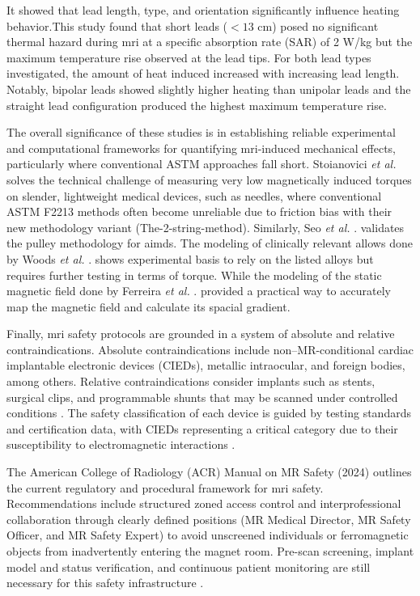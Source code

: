 It showed that lead length, type, and orientation significantly influence heating behavior.This study found that short leads ($<13$ cm) posed no significant thermal hazard during \gls{mri} at a specific absorption rate (SAR) of 2 W/kg but the maximum temperature rise observed at the lead tips. For both lead types investigated, the amount of heat induced increased with increasing lead length. Notably, bipolar leads showed slightly higher heating than unipolar leads and the straight lead configuration produced the highest maximum temperature rise.


The overall significance of these studies is in establishing reliable experimental and computational frameworks for quantifying \gls{mri}-induced mechanical effects, particularly where conventional ASTM approaches fall short. Stoianovici \textit{et al.} \cite{stoianovici2024} solves the technical challenge of measuring very low magnetically induced torques on slender, lightweight medical devices, such as needles, where conventional ASTM F2213 methods often become unreliable due to friction bias with their new methodology variant (The-2-string-method). Similarly, Seo \textit{et al.} . \cite{Seo2021767} validates the pulley methodology for \gls{aimd}s. The modeling of clinically relevant allows done by Woods \textit{et al.} . \cite{Woods2021_MRIdisplacement} shows experimental basis to rely on the listed alloys but requires further testing in terms of torque. While the modeling of the static magnetic field done by Ferreira \textit{et al.} . \cite{ferreira2017} provided a practical way to accurately map the magnetic field and calculate its spacial gradient.  

Finally, \gls{mri} safety protocols are grounded in a system of absolute and relative contraindications. Absolute contraindications include non–MR-conditional cardiac implantable electronic devices (CIEDs), metallic intraocular, and foreign bodies, among others. Relative contraindications consider implants such as stents, surgical clips, and programmable shunts that may be scanned under controlled conditions \cite{Ghadimi2025}. The safety classification of each device is guided by testing standards and certification data, with CIEDs representing a critical category due to their susceptibility to electromagnetic interactions \cite{Schenck2000, fda2023testing}. 

The American College of Radiology (ACR) Manual on MR Safety (2024) \cite{ACR_Manual_on_MR_Safety_2024} outlines the current regulatory and procedural framework for \gls{mri} safety. Recommendations include structured zoned access control and interprofessional collaboration through clearly defined positions (MR Medical Director, MR Safety Officer, and MR Safety Expert) to avoid unscreened individuals or ferromagnetic objects from inadvertently entering the magnet room. Pre-scan screening, implant model and status verification, and continuous patient monitoring are still necessary for this safety infrastructure \cite{Ghadimi2025}.



